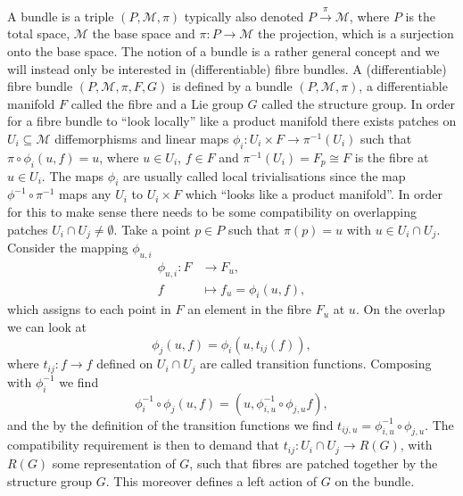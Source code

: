 A bundle is a triple $(P,\mathcal{M},\pi)$ typically also denoted $P\overset{\pi}{\longrightarrow}\mathcal{M}$, where $P$ is the total space, $\mathcal{M}$ the base space and $\pi: P\to \mathcal{M}$ the projection, which is a surjection onto the base space. The notion of a bundle is a rather general concept and we will instead only be interested in (differentiable) fibre bundles. A (differentiable) fibre bundle $(P,\mathcal{M},\pi,F,G)$ is defined by a bundle $(P,\mathcal{M},\pi)$, a differentiable manifold $F$ called the fibre and a Lie group $G$ called the structure group. In order for a fibre bundle to ``look locally'' like a product manifold there exists patches on $U_i\subseteq \mathcal{M}$ diffemorphisms and linear maps $\phi_i: U_i\times F\to \pi^{-1}(U_i)$ such that $\pi\circ \phi_i(u,f)=u$, where $u\in U_i$, $f\in F$ and $\pi^{-1}(U_i)=F_p\cong F$ is the fibre at $u\in U_i$. The maps $\phi_i$ are usually called local trivialisations since the map $\phi^{-1}\circ \pi^{-1}$ maps any $U_i$ to $U_i\times F$ which ``looks like a product manifold''. In order for this to make sense there needs to be some compatibility on overlapping patches $U_i\cap U_j\neq \emptyset$. Take a point $p\in P$ such that $\pi(p)=u$ with $u\in U_i\cap U_j$. Consider the mapping $\phi_{u,i}$
\begin{equation}
    \begin{aligned}
        \phi_{u,i}: F&\to F_u,\\
            f&\mapsto f_u = \phi_i(u,f),
    \end{aligned}
\end{equation}
which assigns to each point in $F$ an element in the fibre $F_u$ at $u$. On the overlap we can look at 
\begin{equation}
    \phi_{j}(u,f) = \phi_{i}(u,t_{ij}(f)),
\end{equation}
where $t_{ij}:f\to f$ defined on $U_i\cap U_j$ are called transition functions. Composing with $\phi_i^{-1}$ we find 
\begin{equation}
    \phi_{i}^{-1}\circ\phi_j (u,f) = (u,\phi^{-1}_{i,u}\circ \phi_{j,u}f),
\end{equation}
and the by the definition of the transition functions we find $t_{ij,u}=\phi^{-1}_{i,u}\circ \phi_{j,u}$. The compatibility requirement is then to demand that $t_{ij}: U_i\cap U_j\to R(G)$, with $R(G)$ some representation of $G$, such that fibres are patched together by the structure group $G$. This moreover defines a left action of $G$ on the bundle.

